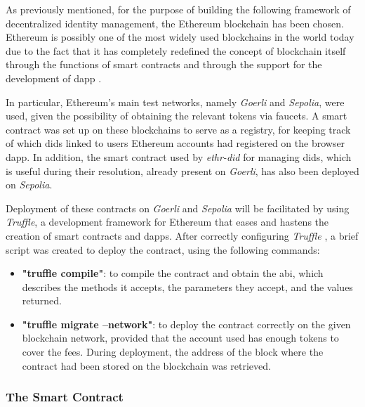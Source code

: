 As previously mentioned, for the purpose of building the following framework of decentralized identity management, the Ethereum blockchain has been chosen. Ethereum is 
possibly one of the most widely used blockchains in the world today due to the fact that it has completely redefined the concept of blockchain itself through the functions 
of smart contracts and through the support for the development of \gls{dapp} \cite{ethereum}.

In particular, Ethereum's main test networks, namely \textit{Goerli} and \textit{Sepolia}, were used, given the possibility of obtaining the relevant tokens via faucets. A smart contract was 
set up on these blockchains to serve as a registry, for keeping track of which \gls{did}s linked to users Ethereum accounts had registered on the browser \gls{dapp}. In 
addition, the smart contract used by \textit{ethr-did} for managing \gls{did}s, which is useful during their resolution, already present on \textit{Goerli}, has also been 
deployed on \textit{Sepolia}.

Deployment of these contracts on \textit{Goerli} and \textit{Sepolia} will be facilitated by using \textit{Truffle}, a development framework for Ethereum that eases and hastens the creation of smart 
contracts and \gls{dapp}s. After correctly configuring \textit{Truffle} \cite{truffle-suite}, a brief script was created to deploy the contract, using the following commands: 

\begin{itemize}
  \item \textbf{"truffle compile"}: to compile the contract and obtain the \gls{abi}, which describes the methods it accepts, the parameters they accept, and the values returned.
  \item \textbf{"truffle migrate --network"}: to deploy the contract correctly on the given blockchain network, provided that the account used has enough tokens to cover 
  the fees. During deployment, the address of the block where the contract had been stored on the blockchain was retrieved.
\end{itemize}

\newpage



\subsubsection{The Smart Contract}

